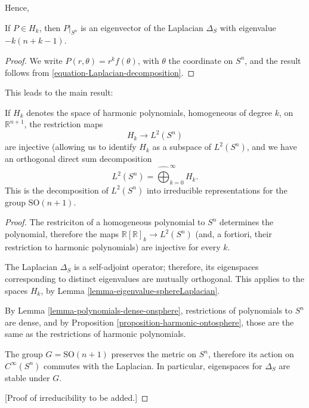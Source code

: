 Hence, 
\begin{lemma}
 \label{lemma-eigenvalue-sphereLaplacian}
If $P\in H_k$, then $P|_{S^n}$ is an eigenvector of the Laplacian $\Delta_S$ with eigenvalue $-k(n+k-1)$.
\end{lemma}

\begin{proof}
 We write $P (r,\theta) = r^k f(\theta)$, with $\theta$ the coordinate on $S^n$, and the result follows from \eqref{equation-Laplacian-decomposition}.
\end{proof}

This leads to the main result:
\begin{theorem}
 \label{theorem-sphericalharmonics}
If $H_k$ denotes the space of harmonic polynomials, homogeneous of degree $k$, on $\mathbb R^{n+1}$, the restriction maps
$$H_k \to L^2(S^n)$$
are injective (allowing us to identify $H_k$ as a subspace of $L^2(S^n)$, and we have an orthogonal direct sum decomposition 
$$ L^2(S^n) = \hat\bigoplus_{k=0}^\infty H_k.$$
This is the decomposition of $L^2(S^n)$ into irreducible representations for the group $\text{SO}(n+1)$.
\end{theorem}

\begin{proof}
 The restriciton of a homogeneous polynomial to $S^n$ determines the polynomial, therefore the maps $\mathbb R[\mathbb R]_k \to L^2(S^n)$ (and, a fortiori, their restriction to harmonic polynomials) are injective for every $k$.
 
 The Laplacian $\Delta_S$ is a self-adjoint operator; therefore, its eigenspaces corresponding to distinct eigenvalues are mutually orthogonal. This applies to the spaces $H_k$, by Lemma \ref{lemma-eigenvalue-sphereLaplacian}.
 
 By Lemma  \ref{lemma-polynomials-dense-onsphere}, restrictions of polynomials to $S^n$ are dense, and by Proposition \ref{proposition-harmonic-ontosphere}, those are the same as the restrictions of harmonic polynomials.
 
 The group $G=\text{SO}(n+1)$ preserves the metric on $S^n$, therefore its action on $C^\infty(S^n)$ commutes with the Laplacian. In particular, eigenspaces for $\Delta_S$ are stable under $G$. 
 
 [Proof of irreducibility to be added.]
\end{proof}












